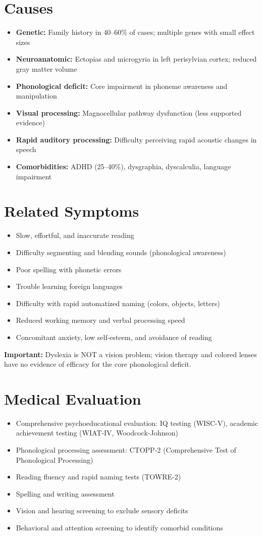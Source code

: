 \section*{Causes}
\begin{itemize}
  \item \textbf{Genetic:} Family history in 40--60\% of cases; multiple genes with small effect sizes
  \item \textbf{Neuroanatomic:} Ectopias and microgyria in left perisylvian cortex; reduced gray matter volume
  \item \textbf{Phonological deficit:} Core impairment in phoneme awareness and manipulation
  \item \textbf{Visual processing:} Magnocellular pathway dysfunction (less supported evidence)
  \item \textbf{Rapid auditory processing:} Difficulty perceiving rapid acoustic changes in speech
  \item \textbf{Comorbidities:} ADHD (25--40\%), dysgraphia, dyscalculia, language impairment
\end{itemize}

\section*{Related Symptoms}
\begin{itemize}
  \item Slow, effortful, and inaccurate reading
  \item Difficulty segmenting and blending sounds (phonological awareness)
  \item Poor spelling with phonetic errors
  \item Trouble learning foreign languages
  \item Difficulty with rapid automatized naming (colors, objects, letters)
  \item Reduced working memory and verbal processing speed
  \item Concomitant anxiety, low self-esteem, and avoidance of reading
\end{itemize}
\textbf{Important:} Dyslexia is NOT a vision problem; vision therapy and colored lenses have no evidence of efficacy for the core phonological deficit.

\section*{Medical Evaluation}
\begin{itemize}
  \item Comprehensive psychoeducational evaluation: IQ testing (WISC-V), academic achievement testing (WIAT-IV, Woodcock-Johnson)
  \item Phonological processing assessment: CTOPP-2 (Comprehensive Test of Phonological Processing)
  \item Reading fluency and rapid naming tests (TOWRE-2)
  \item Spelling and writing assessment
  \item Vision and hearing screening to exclude sensory deficits
  \item Behavioral and attention screening to identify comorbid conditions
\end{itemize}

